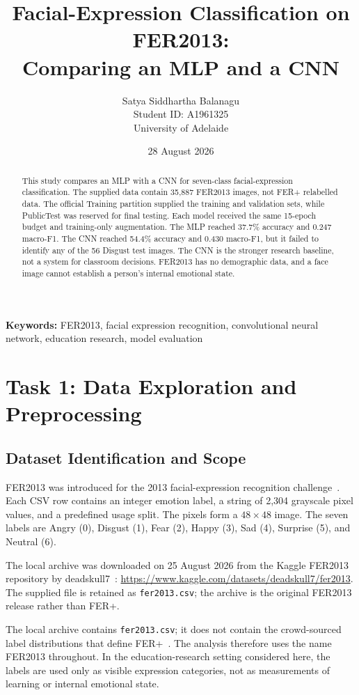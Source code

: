 \documentclass[10pt,twocolumn]{article}
\title{\textbf{Facial-Expression Classification on FER2013:}\\
\large Comparing an MLP and a CNN}
\author{
Satya Siddhartha Balanagu\\
Student ID: A1961325\\
University of Adelaide
}
\date{28 August 2026}
\newcommand{\task}[1]{\section{Task #1}}
\begin{document}
\raggedbottom
\maketitle

\begin{abstract}
This study compares an MLP with a CNN for seven-class facial-expression classification. The supplied data contain 35,887 FER2013 images, not FER+ relabelled data. The official Training partition supplied the training and validation sets, while PublicTest was reserved for final testing. Each model received the same 15-epoch budget and training-only augmentation. The MLP reached 37.7\% accuracy and 0.247 macro-F1. The CNN reached 54.4\% accuracy and 0.430 macro-F1, but it failed to identify any of the 56 Disgust test images. The CNN is the stronger research baseline, not a system for classroom decisions. FER2013 has no demographic data, and a face image cannot establish a person's internal emotional state.
\end{abstract}

\noindent\textbf{Keywords:} FER2013, facial expression recognition, convolutional neural network, education research, model evaluation

\task{1: Data Exploration and Preprocessing}

\subsection{Dataset Identification and Scope}

FER2013 was introduced for the 2013 facial-expression recognition challenge~\cite{goodfellow2013}. Each CSV row contains an integer emotion label, a string of 2,304 grayscale pixel values, and a predefined usage split. The pixels form a $48\times48$ image. The seven labels are Angry (0), Disgust (1), Fear (2), Happy (3), Sad (4), Surprise (5), and Neutral (6).

The local archive was downloaded on 25 August 2026 from the Kaggle FER2013 repository by deadskull7~\cite{fer2013kaggle}: \url{https://www.kaggle.com/datasets/deadskull7/fer2013}. The supplied file is retained as \texttt{fer2013.csv}; the archive is the original FER2013 release rather than FER+.

The local archive contains \texttt{fer2013.csv}; it does not contain the crowd-sourced label distributions that define FER+~\cite{barsoum2016}. The analysis therefore uses the name FER2013 throughout. In the education-research setting considered here, the labels are used only as visible expression categories, not as measurements of learning or internal emotional state.
\end{document}
